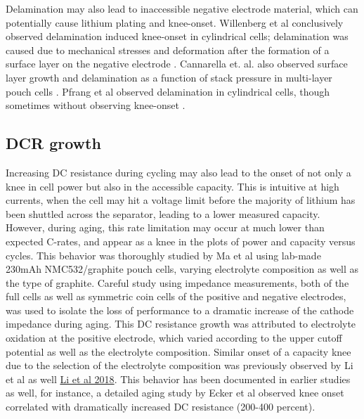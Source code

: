 \documentclass{article}
\begin{document}
Delamination may also lead to inaccessible negative electrode material, which can potentially cause lithium plating and knee-onset. Willenberg et al conclusively observed delamination induced knee-onset in cylindrical cells; delamination was caused due to mechanical stresses and deformation after the formation of a surface layer on the negative electrode \cite{willenberg_high-precision_2020}. Cannarella et. al. also observed surface layer growth and delamination as a function of stack pressure in multi-layer pouch cells \cite{cannarella_stress_2014}. Pfrang et al observed delamination in cylindrical cells, though sometimes without observing knee-onset \cite{pfrang_long-term_2018}.




\subsection{DCR growth}
Increasing DC resistance during cycling may also lead to the onset of not only a knee in cell power but also in the accessible capacity. This is intuitive at high currents, when the cell may hit a voltage limit before the majority of lithium has been shuttled across the separator, leading to a lower measured capacity. However, during aging, this rate limitation may occur at much lower than expected C-rates, and appear as a knee in the plots of power and capacity versus cycles. This behavior was thoroughly studied by Ma et al \cite{ma_editors_2019} using lab-made 230mAh NMC532/graphite pouch cells, varying electrolyte composition as well as the type of graphite. Careful study using impedance measurements, both of the full cells as well as symmetric coin cells of the positive and negative electrodes, was used to isolate the loss of performance to a dramatic increase of the cathode impedance during aging. This DC resistance growth was attributed to electrolyte oxidation at the positive electrode, which varied according to the upper cutoff potential as well as the electrolyte composition. Similar onset of a capacity knee due to the selection of the electrolyte composition was previously observed by Li et al as well \href{https://iopscience.iop.org/article/10.1149/2.0861805jes/pdf}{Li et al 2018}. This behavior has been documented in earlier studies as well, for instance, a detailed aging study by Ecker et al \cite{ecker_calendar_2014} observed knee onset correlated with dramatically increased DC resistance (200-400 percent).
\end{document}
